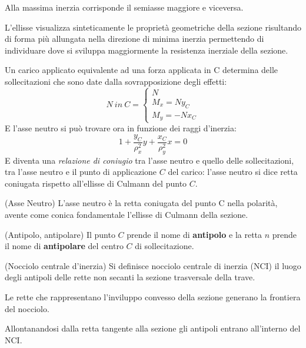 		Alla massima inerzia corrisponde il semiasse maggiore e viceversa.
		
		L’ellisse
		visualizza sinteticamente le proprietà geometriche della sezione risultando di forma più
		allungata nella direzione di minima inerzia permettendo di individuare dove si sviluppa maggiormente la resistenza inerziale della sezione. \newline 
		
		Un carico applicato equivalente ad una forza applicata in C
		determina delle sollecitazioni che sono date dalla
		sovrapposizione degli effetti:
		\[
		N ~ in ~ C = \begin{cases}
			N \\
			M_x = Ny_C \\
			M_y = -Nx_C
		\end{cases}
		\] 
		E l'asse neutro si può trovare ora in funzione dei raggi d'inerzia: 
		\[ 1+ \dfrac{y_C}{\rho^2_x}y + \dfrac{x_C}{\rho^2_y}x = 0\]
		E diventa una \textit{relazione di coniugio} tra l'asse neutro e quello delle sollecitazioni, tra l'asse neutro e il punto di applicazione $C$ del carico: l'asse neutro si dice retta coniugata rispetto all'ellisse di Culmann del punto $ C $. \newline 
		
		\begin{definizione} (Asse Neutro)
			L'asse neutro è la retta coniugata del punto C nella polarità, avente come conica fondamentale l'ellisse di Culmann della sezione. 
		\end{definizione} 
		
		\begin{definizione} (Antipolo, antipolare)
			Il punto $C$ prende il nome di \textbf{antipolo} e la retta $n$ prende il nome di \textbf{antipolare} del centro $C$ di sollecitazione.
		\end{definizione}
		
		\begin{definizione} (Nocciolo centrale d'inerzia)
			Si definisce nocciolo centrale di inerzia (NCI) il luogo degli antipoli delle rette non secanti la sezione
		trasversale della trave.
		
		Le rette che rappresentano l'inviluppo convesso della sezione generano la frontiera del nocciolo.
		\end{definizione} 		
		
		Allontanandosi dalla retta tangente alla sezione gli antipoli entrano all'interno del NCI. \newline 
		
